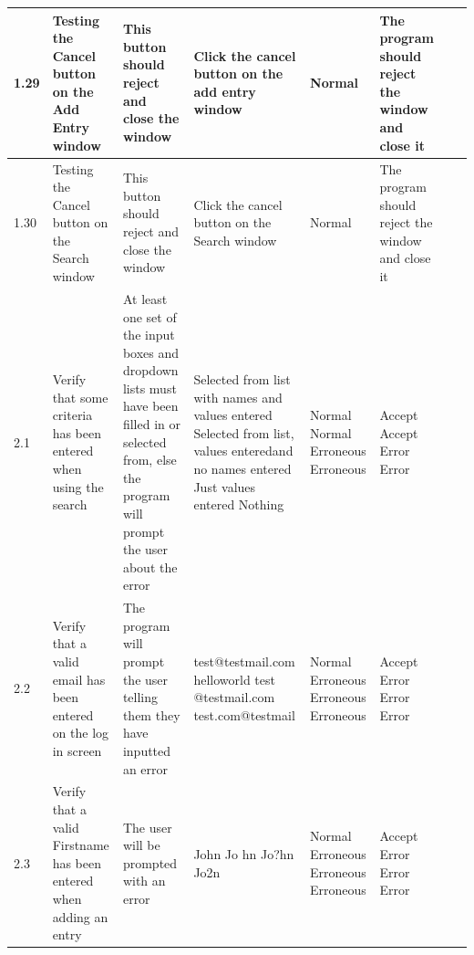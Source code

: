\begin{landscape}
\begin{center}
\begin{longtable}{|p{1.5cm}|p{2cm}|p{2.5cm}|p{2.5cm}|p{2cm}|p{2cm}|p{2cm}|p{2cm}|}
\rowcolor{lightgray} 1.29 & Testing the Cancel button on the Add Entry window & This button should reject and close the window & Click the cancel button on the add entry window & Normal & The program should reject the window and close it & & \\ \hline
\rowcolor{lightgray} 1.30 & Testing the Cancel button on the Search window & This button should reject and close the window & Click the cancel button on the Search window & Normal & The program should reject the window and close it & & \\ \hline
        2.1 & Verify that some criteria has been entered when using the search & At least one set of the input boxes and dropdown lists must have been filled in or selected from, else the program will prompt the user about the error & Selected from list with names and values entered \newline Selected from list, values enteredand no names entered \newline Just values entered \newline Nothing   & Normal \newline Normal \newline Erroneous \newline Erroneous & Accept \newline Accept \newline Error \newline Error & & \\ \hline
        2.2 & Verify that a valid email has been entered on the log in screen &  The program will prompt the user telling them they have inputted an error & test@testmail.com \newline helloworld \newline test \newline @testmail.com \newline test.com@testmail & Normal \newline Erroneous \newline Erroneous \newline Erroneous & Accept \newline Error \newline Error \newline Error & & \\ \hline
        2.3 & Verify that a valid Firstname has been entered when adding an entry & The user will be prompted with an error & John \newline Jo hn \newline Jo?hn \newline Jo2n & Normal \newline Erroneous \newline Erroneous \newline Erroneous & Accept \newline Error \newline Error \newline Error & & \\ \hline

\end{longtable}
\end{center}
\end{landscape}
